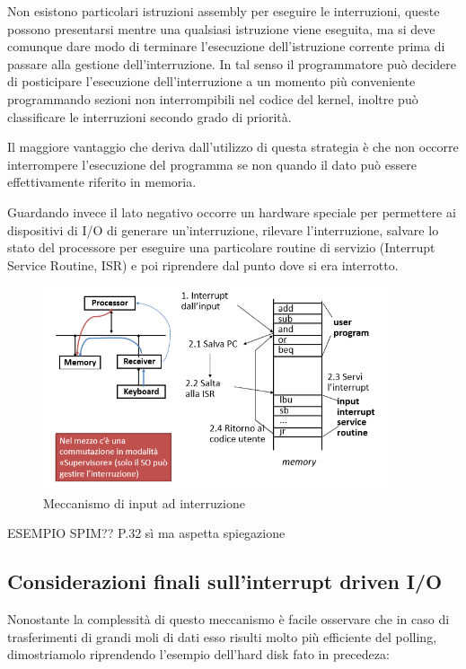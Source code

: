 \documentclass[class=book, crop=false, oneside]{standalone}
\begin{document}
Non esistono particolari istruzioni assembly per eseguire le interruzioni, queste possono presentarsi mentre una qualsiasi istruzione viene eseguita, ma si deve comunque dare modo di terminare l’esecuzione dell’istruzione corrente prima di passare alla gestione dell'interruzione.
In tal senso il programmatore può decidere di posticipare l’esecuzione dell’interruzione a un momento più conveniente programmando sezioni non interrompibili nel codice del kernel, inoltre può classificare le interruzioni secondo grado di priorità.

Il maggiore vantaggio che deriva dall'utilizzo di questa strategia è che non occorre interrompere l’esecuzione del programma se non quando il dato può essere effettivamente riferito in memoria.

Guardando invece il lato negativo occorre un hardware speciale per permettere ai dispositivi di I/O di generare un’interruzione, rilevare l’interruzione, salvare lo stato del processore per eseguire una particolare routine di servizio (Interrupt Service Routine, ISR) e poi riprendere dal punto dove si era interrotto.

\begin{figure}[H]
	\centering
	\includegraphics[width=0.9\textwidth,keepaspectratio]{input-a-interruzione}
	\caption{Meccanismo di input ad interruzione}
\end{figure}

ESEMPIO SPIM?? P.32 sì ma aspetta spiegazione

\subsection{Considerazioni finali sull'interrupt driven I/O}
Nonostante la complessità di questo meccanismo è facile osservare che in caso di trasferimenti di grandi moli di dati esso risulti  molto più efficiente del polling, dimostriamolo riprendendo l'esempio dell'hard disk fato in precedeza:
\end{document}
